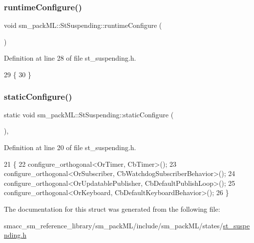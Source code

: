 \subsubsection{\texorpdfstring{runtime\+Configure()}{runtimeConfigure()}}
{\footnotesize\ttfamily void sm\+\_\+pack\+M\+L\+::\+St\+Suspending\+::runtime\+Configure (\begin{DoxyParamCaption}{ }\end{DoxyParamCaption})\hspace{0.3cm}{\ttfamily [inline]}}



Definition at line 28 of file st\+\_\+suspending.\+h.


\begin{DoxyCode}
29     \{
30     \}
\end{DoxyCode}
\mbox{\label{structsm__packML_1_1StSuspending_a093cc3c1f8a1db5eed1d1af86b548852}} 
\subsubsection{\texorpdfstring{static\+Configure()}{staticConfigure()}}
{\footnotesize\ttfamily static void sm\+\_\+pack\+M\+L\+::\+St\+Suspending\+::static\+Configure (\begin{DoxyParamCaption}{ }\end{DoxyParamCaption})\hspace{0.3cm}{\ttfamily [inline]}, {\ttfamily [static]}}



Definition at line 20 of file st\+\_\+suspending.\+h.


\begin{DoxyCode}
21     \{
22         configure\_orthogonal<OrTimer, CbTimer>();   
23         configure\_orthogonal<OrSubscriber, CbWatchdogSubscriberBehavior>();
24         configure\_orthogonal<OrUpdatablePublisher, CbDefaultPublishLoop>();
25         configure\_orthogonal<OrKeyboard, CbDefaultKeyboardBehavior>();
26     \}
\end{DoxyCode}


The documentation for this struct was generated from the following file\+:\begin{DoxyCompactItemize}
\item 
smacc\+\_\+sm\+\_\+reference\+\_\+library/sm\+\_\+pack\+M\+L/include/sm\+\_\+pack\+M\+L/states/\hyperlink{st__suspending_8h}{st\+\_\+suspending.\+h}\end{DoxyCompactItemize}
